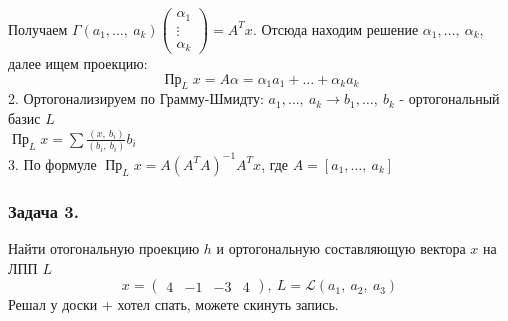 \documentclass[12pt, letterpaper, twoside]{article}
\newcommand{\DS}{\displaystyle}
\newcommand{\Pro}{\operatorname{\text{Пр}}}
\begin{document}
Получаем $\Gamma(a_1,\dots,\ a_k)\begin{pmatrix}
    \alpha_1\\
    \vdots\\
    \alpha_k
\end{pmatrix} = A^T x$. Отсюда находим решение $\alpha_1,\dots,\ \alpha_k$, далее ищем проекцию:
\[\Pro _L x =  A\alpha = \alpha_1 a_1 + \dots + \alpha_k a_k\]
2. Ортогонализируем по Грамму-Шмидту: $a_1,\dots,\ a_k \to b_1,\dots,\ b_k$ - ортогональный базис $L$\\
$\Pro _L x = \DS \sum \frac{(x,\ b_i)}{(b_i,\ b_i)} b_i$\\
3. По формуле $\Pro_L x = A(A^T A)^{-1} A^T x$, где $A = [a_1,\dots,\ a_k]$
\subsubsection*{Задача 3.}
Найти отогональную проекцию $h$ и ортогональную составляющую вектора $x$ на ЛПП $L$
\[x = \begin{pmatrix}4 & -1 & -3 & 4\end{pmatrix},\ L = \mathcal{L}(a_1,\ a_2,\ a_3)\]
Решал у доски + хотел спать, можете скинуть запись.
\end{document}
